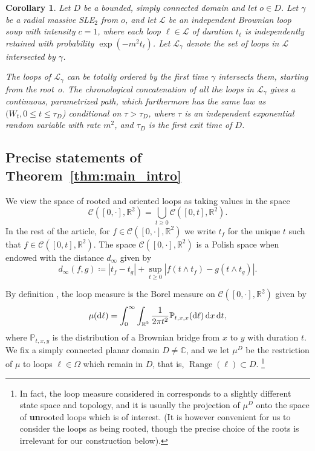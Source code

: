 \documentclass[11pt]{article}
\newtheorem{corollary}[theorem]{Corollary}
\def\d{\,{\rm d}}
\def\cL{{\mathcal L}}
\DeclareMathOperator{\Range}{Range}
\begin{document}
\begin{corollary}
    \label{cor:massive}
Let $D$ be a bounded, simply connected domain and let $o \in D$. Let $\gamma$ be a radial massive SLE$_2$ from $o$, and let $\cL$ be an independent Brownian loop soup with intensity $c = 1$, where each loop $
\ell \in \cL$ of duration $t_\ell$ is independently retained with probability $\exp ( - m^2 t_\ell)$. Let $\cL_\gamma$ denote the set of loops in $\cL$ intersected by $\gamma$. 

The loops of $\cL_\gamma$ can be totally ordered by the first time $\gamma$ intersects them, starting from the root~$o$. The chronological concatenation of all the loops in $\cL_\gamma$ gives a continuous, parametrized path, which furthermore has the same law as $(W_t, 0 \le t \le \tau_D$) conditional on $\tau > \tau_D$, where $\tau$ is an independent exponential random variable with rate $m^2$, and $\tau_D$ is the first exit time of $D$.
\end{corollary}





\subsection{Precise statements of Theorem~\ref{thm:main_intro}}


We view the space of rooted and oriented loops as taking values in the space
\[
\mathcal{C}([0,\cdot], \mathbb{R}^2) = \bigcup_{t\ge 0} \mathcal{C}([0,t], \mathbb{R}^2).
\]
In the rest of the article, for $f\in \mathcal{C}([0,\cdot], \mathbb{R}^2)$ we write $t_f$ for the unique $t$ such that $f\in\mathcal{C}([0,t], \mathbb{R}^2) $.
The space $\mathcal{C}([0,\cdot], \mathbb{R}^2)$ is a Polish space when endowed with the distance $d_\infty$ given by
\[d_\infty(f,g)\coloneqq |t_f-t_g| + \sup_{t \geq 0} |f(t\wedge t_f)-g(t\wedge t_g)|. \]

By definition \cite{LawlerWerner}, the loop measure is the Borel measure on $\mathcal{C}([0,\cdot], \mathbb{R}^2)$ given by
\[
\mu ( \mathrm{d} \ell ) =\int_0^\infty \int_{\mathbb{R}^2} \frac{1}{2 \pi t^2} \mathbb{P}_{t,x,x} ( \mathrm{d} \ell) \d x \d t,
\]
where $\mathbb{P}_{t,x,y}$ is the distribution of a Brownian bridge from $x$ to $y$ with duration $t$. We fix a simply connected planar domain $D\neq \mathbb{C}$, and we let $\mu^D$ be the restriction of $\mu$ to loops $\ell \in \Omega$ which remain in $D$, that is, $\Range(\ell) \subset D$.
\footnote{
In fact, the loop measure considered in \cite{LawlerWerner} corresponds to a slightly different state space and topology, and it is usually the projection of $\mu^D$ onto the space of \textbf{un}rooted loops which is of interest. (It is however convenient for us to consider the loops as being rooted, though the precise choice of the roots is irrelevant for our construction below).}
\end{document}
